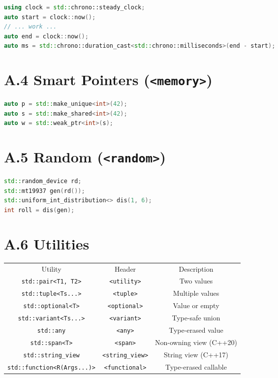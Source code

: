 \begin{lstlisting}[language=C++]
using clock = std::chrono::steady_clock;
auto start = clock::now();
// ... work ...
auto end = clock::now();
auto ms = std::chrono::duration_cast<std::chrono::milliseconds>(end - start);
\end{lstlisting}

\section{A.4 Smart Pointers (\texttt{<memory>})}

\begin{lstlisting}[language=C++]
auto p = std::make_unique<int>(42);
auto s = std::make_shared<int>(42);
auto w = std::weak_ptr<int>(s);
\end{lstlisting}

\section{A.5 Random (\texttt{<random>})}

\begin{lstlisting}[language=C++]
std::random_device rd;
std::mt19937 gen(rd());
std::uniform_int_distribution<> dis(1, 6);
int roll = dis(gen);
\end{lstlisting}

\section{A.6 Utilities}

\begin{center}
\begin{tabular}{ccc}
\toprule
Utility & Header & Description \\
\texttt{std::pair<T1, T2>} & \texttt{<utility>} & Two values \\
\texttt{std::tuple<Ts...>} & \texttt{<tuple>} & Multiple values \\
\texttt{std::optional<T>} & \texttt{<optional>} & Value or empty \\
\texttt{std::variant<Ts...>} & \texttt{<variant>} & Type-safe union \\
\texttt{std::any} & \texttt{<any>} & Type-erased value \\
\texttt{std::span<T>} & \texttt{<span>} & Non-owning view (C++20) \\
\texttt{std::string\_view} & \texttt{<string\_view>} & String view (C++17) \\
\texttt{std::function<R(Args...)>} & \texttt{<functional>} & Type-erased callable \\
\bottomrule
\end{tabular}
\end{center}
\bigskip

